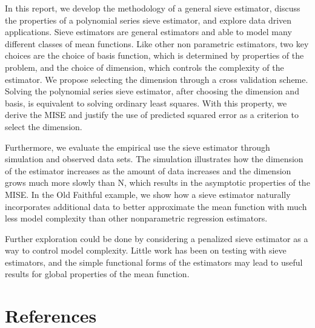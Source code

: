 \documentclass[12pt]{article}  %
\begin{document}
In this report, we develop the methodology of a general sieve estimator, discuss the properties of a polynomial series sieve estimator, and explore data driven applications. Sieve estimators are general estimators and able to model many different classes of mean functions. Like other non parametric estimators, two key  choices are the choice of basis function, which is determined by properties of the problem, and the choice of dimension, which controls the complexity of the estimator.  We propose selecting the dimension through a cross validation scheme. Solving the polynomial series sieve estimator, after choosing the dimension and basis, is equivalent to solving ordinary least squares. With this property, we derive the MISE and justify the use of predicted squared error as a criterion to select the dimension. 

Furthermore, we evaluate the empirical use the sieve estimator through simulation and observed data sets. The simulation illustrates how the dimension of the estimator increases as the amount of data increases and the dimension grows much more slowly than N, which results in the asymptotic properties of the  MISE.  In the Old Faithful example, we show how a sieve estimator naturally incorporates additional data to better approximate the mean function with much less model complexity than other nonparametric regression estimators. 

Further exploration could be done by considering a penalized sieve estimator as a way to control model complexity. Little work has been on testing with sieve estimators, and the simple functional forms of the estimators may lead to useful results for global properties of the mean function. 


\section{References}
\nocite{*}
\printbibliography[heading=none]
\end{document}
